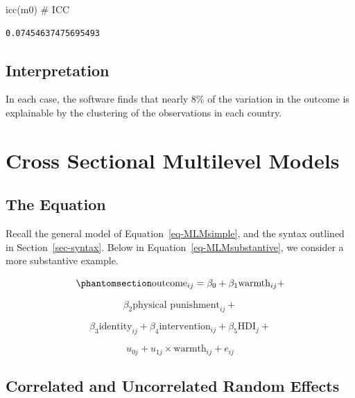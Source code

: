 \documentclass[
  letterpaper,
  DIV=11,
  numbers=noendperiod]{scrreprt}
\newenvironment{Shaded}{\begin{snugshade}}{\end{snugshade}}
\newcommand{\CommentTok}[1]{\textcolor[rgb]{0.37,0.37,0.37}{#1}}
\newcommand{\FunctionTok}[1]{\textcolor[rgb]{0.28,0.35,0.67}{#1}}
\newcommand{\NormalTok}[1]{\textcolor[rgb]{0.00,0.23,0.31}{#1}}
\begin{document}
\begin{Shaded}
\begin{Highlighting}[]

\FunctionTok{icc}\NormalTok{(m0) }\CommentTok{\# ICC}
\end{Highlighting}
\end{Shaded}

\begin{verbatim}
0.07454637475695493
\end{verbatim}

\section{Interpretation}\label{interpretation-1}

In each case, the software finds that nearly 8\% of the variation in the
outcome is explainable by the clustering of the observations in each
country.


\chapter{Cross Sectional Multilevel
Models}\label{cross-sectional-multilevel-models}

\section{The Equation}\label{the-equation-1}

Recall the general model of Equation~\ref{eq-MLMsimple}, and the syntax
outlined in Section~\ref{sec-syntax}. Below in
Equation~\ref{eq-MLMsubstantive}, we consider a more substantive
example.

\begin{equation}\phantomsection\label{eq-MLMsubstantive}{\text{outcome}_{ij}= \beta_0 + \beta_1 \text{warmth}_{ij} +}\end{equation}

\[\beta_2 \text{physical punishment}_{ij} +\]

\[\beta_3 \text{identity}_{ij} + \beta_4 \text{intervention}_{ij} + \beta_5 \text{HDI}_{j} +\]

\[u_{0j} + u_{1j} \times \text{warmth}_{ij} + e_{ij}\]

\section{Correlated and Uncorrelated Random
Effects}\label{correlated-and-uncorrelated-random-effects}
\end{document}
